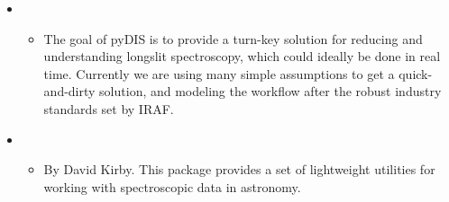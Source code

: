 \documentclass[letterpaper,10pt,english]{sphinxmanual}
\begin{document}
\begin{itemize}
\begin{itemize}
\end{itemize}

\item {} 
\begin{itemize}
\item {} 
The goal of pyDIS is to provide a turn-key solution for reducing
and understanding longslit spectroscopy, which could ideally be
done in real time. Currently we are using many simple assumptions
to get a quick-and-dirty solution, and modeling the workflow after
the robust industry standards set by IRAF.

\end{itemize}

\item {} 
\begin{itemize}
\item {} 
By David Kirby. This package provides a set of lightweight
utilities for working with spectroscopic data in astronomy.

\end{itemize}

\end{itemize}
\end{document}
